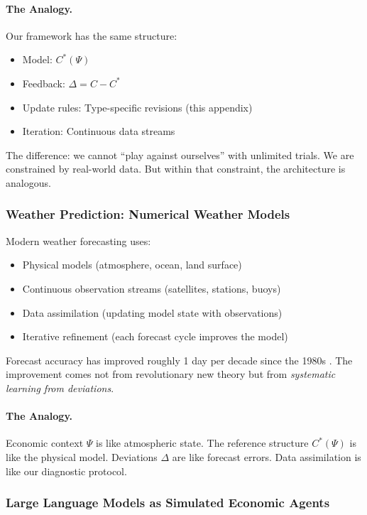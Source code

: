 \paragraph{The Analogy.}
Our framework has the same structure:
\begin{itemize}
    \item Model: $C^*(\Psi)$
    \item Feedback: $\Delta = C - C^*$
    \item Update rules: Type-specific revisions (this appendix)
    \item Iteration: Continuous data streams
\end{itemize}

The difference: we cannot ``play against ourselves'' with unlimited trials. 
We are constrained by real-world data. But within that constraint, the 
architecture is analogous.

\subsubsection{Weather Prediction: Numerical Weather Models}

Modern weather forecasting uses:
\begin{itemize}
    \item Physical models (atmosphere, ocean, land surface)
    \item Continuous observation streams (satellites, stations, buoys)
    \item Data assimilation (updating model state with observations)
    \item Iterative refinement (each forecast cycle improves the model)
\end{itemize}

Forecast accuracy has improved roughly 1 day per decade since the 1980s 
\citep{bauer2015}. The improvement comes not from revolutionary new theory 
but from \emph{systematic learning from deviations}.

\paragraph{The Analogy.}
Economic context $\Psi$ is like atmospheric state. The reference structure 
$C^*(\Psi)$ is like the physical model. Deviations $\Delta$ are like forecast 
errors. Data assimilation is like our diagnostic protocol.

\subsubsection{Large Language Models as Simulated Economic Agents}

